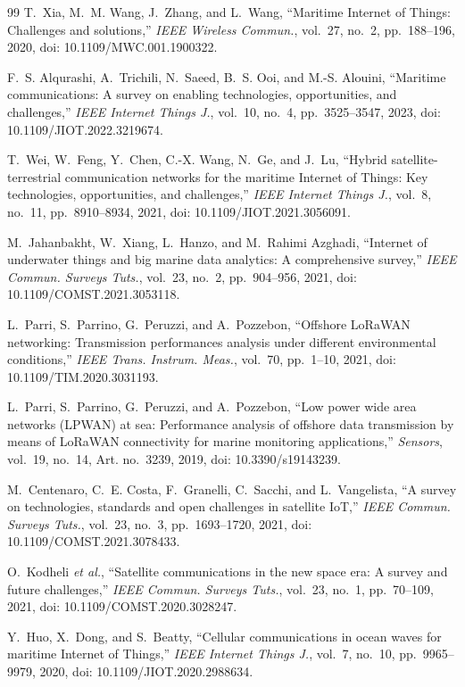 \begin{thebibliography}{99}
\footnotesize
{} T.~Xia, M.~M. Wang, J.~Zhang, and L.~Wang, ``Maritime Internet of Things: Challenges and solutions,'' \emph{IEEE Wireless Commun.}, vol.~27, no.~2, pp.~188--196, 2020, doi: 10.1109/MWC.001.1900322.

 F.~S. Alqurashi, A.~Trichili, N.~Saeed, B.~S. Ooi, and M.-S. Alouini, ``Maritime communications: A survey on enabling technologies, opportunities, and challenges,'' \emph{IEEE Internet Things J.}, vol.~10, no.~4, pp.~3525--3547, 2023, doi: 10.1109/JIOT.2022.3219674.

 T.~Wei, W.~Feng, Y.~Chen, C.-X. Wang, N.~Ge, and J.~Lu, ``Hybrid satellite-terrestrial communication networks for the maritime Internet of Things: Key technologies, opportunities, and challenges,'' \emph{IEEE Internet Things J.}, vol.~8, no.~11, pp.~8910--8934, 2021, doi: 10.1109/JIOT.2021.3056091.

 M.~Jahanbakht, W.~Xiang, L.~Hanzo, and M.~Rahimi Azghadi, ``Internet of underwater things and big marine data analytics: A comprehensive survey,'' \emph{IEEE Commun. Surveys Tuts.}, vol.~23, no.~2, pp.~904--956, 2021, doi: 10.1109/COMST.2021.3053118.

 L.~Parri, S.~Parrino, G.~Peruzzi, and A.~Pozzebon, ``Offshore LoRaWAN networking: Transmission performances analysis under different environmental conditions,'' \emph{IEEE Trans. Instrum. Meas.}, vol.~70, pp.~1--10, 2021, doi: 10.1109/TIM.2020.3031193.

 L.~Parri, S.~Parrino, G.~Peruzzi, and A.~Pozzebon, ``Low power wide area networks (LPWAN) at sea: Performance analysis of offshore data transmission by means of LoRaWAN connectivity for marine monitoring applications,'' \emph{Sensors}, vol.~19, no.~14, Art. no.~3239, 2019, doi: 10.3390/s19143239.

 M.~Centenaro, C.~E. Costa, F.~Granelli, C.~Sacchi, and L.~Vangelista, ``A survey on technologies, standards and open challenges in satellite IoT,'' \emph{IEEE Commun. Surveys Tuts.}, vol.~23, no.~3, pp.~1693--1720, 2021, doi: 10.1109/COMST.2021.3078433.

 O.~Kodheli \emph{et al.}, ``Satellite communications in the new space era: A survey and future challenges,'' \emph{IEEE Commun. Surveys Tuts.}, vol.~23, no.~1, pp.~70--109, 2021, doi: 10.1109/COMST.2020.3028247.

 Y.~Huo, X.~Dong, and S.~Beatty, ``Cellular communications in ocean waves for maritime Internet of Things,'' \emph{IEEE Internet Things J.}, vol.~7, no.~10, pp.~9965--9979, 2020, doi: 10.1109/JIOT.2020.2988634.


\end{thebibliography}
